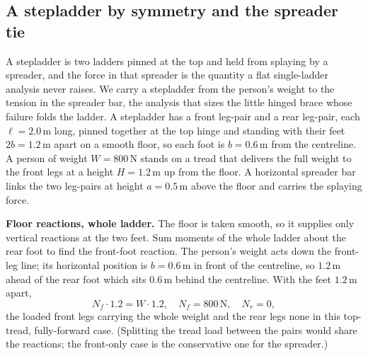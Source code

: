 \subsection{A stepladder by symmetry and the spreader tie}

A stepladder is two ladders pinned at the top and held from splaying by a
spreader, and the force in that spreader is the quantity a flat
single-ladder analysis never raises. We carry a stepladder from the
person's weight to the tension in the spreader bar, the analysis that
sizes the little hinged brace whose failure folds the ladder. A
stepladder has a front leg-pair and a rear leg-pair, each
$\ell = 2.0\,\si{\meter}$ long, pinned together at the top hinge and
standing with their feet $2b = 1.2\,\si{\meter}$ apart on a smooth floor,
so each foot is $b = 0.6\,\si{\meter}$ from the centreline. A person of
weight $W = 800\,\text{N}$ stands on a tread that delivers the full weight
to the front legs at a height $H = 1.2\,\si{\meter}$ up from the floor. A
horizontal spreader bar links the two leg-pairs at height
$a = 0.5\,\si{\meter}$ above the floor and carries the splaying force.

\textbf{Floor reactions, whole ladder.} The floor is taken smooth, so it
supplies only vertical reactions at the two feet. Sum moments of the whole
ladder about the rear foot to find the front-foot reaction. The person's
weight acts down the front-leg line; its horizontal position is
$b = 0.6\,\si{\meter}$ in front of the centreline, so $1.2\,\si{\meter}$
ahead of the rear foot which sits $0.6\,\si{\meter}$ behind the centreline.
With the feet $1.2\,\si{\meter}$ apart,
\[
N_f\cdot 1.2 = W\cdot 1.2, \quad N_f = 800\,\text{N}, \quad N_r = 0,
\]
the loaded front legs carrying the whole weight and the rear legs none in
this top-tread, fully-forward case. (Splitting the tread load between the
pairs would share the reactions; the front-only case is the conservative
one for the spreader.)

